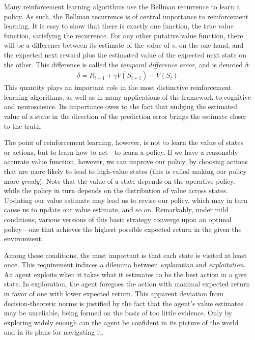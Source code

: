 Many reinforcement learning algorithms use the Bellman recurrence to learn a policy.
As such, the Bellman recurrence is of central importance to reinforcement learning.
It is easy to show that there is exactly one function, the true value function, satisfying the recurrence.
For any other putative value function, there will be a difference between its estimate of the value of $s$, on the one hand, and the expected next reward plus the estimated value of the expected next state on the other.
This difference is called the \emph{temporal difference error}, and is denoted $\delta$:
\begin{align*}
	\delta = R_{t + 1} + \gamma V(S_{t + 1}) - V(S_t)
\end{align*}
This quantity plays an important role in the most distinctive reinforcement learning algorithms, as well as in many applications of the framework to cognitive and neuroscience.
Its importance owes to the fact that nudging the estimated value of a state in the direction of the prediction error brings the estimate closer to the truth.

The point of reinforcement learning, however, is not to learn the value of states or actions, but to learn how to act---to learn a policy.
If we have a reasonably accurate value function, however, we can improve our policy, by choosing actions that are more likely to lead to high-value states (this is called making our policy more \emph{greedy}).
Note that the value of a state depends on the operative policy, while the policy in turn depends on the distribution of value across states.
Updating our value estimate may lead us to revise our policy, which may in turn cause us to update our value estimate, and so on.
Remarkably, under mild conditions, various versions of this basic strategy converge upon an optimal policy---one that achieves the highest possible expected return in the given the environment.

Among these conditions, the most important is that each state is visited at least once.
This requirement induces a dilemma between \emph{exploration} and \emph{exploitation}.
An agent exploits when it takes what it estimates to be the best action in a give state.
In exploration, the agent foregoes the action with maximal expected return in favor of one with lower expected return.
This apparent deviation from decision-theoretic norms is justified by the fact that the agent's value estimates may be unreliable, being formed on the basis of too little evidence.
Only by exploring widely enough can the agent be confident in its picture of the world and in its plans for navigating it.

